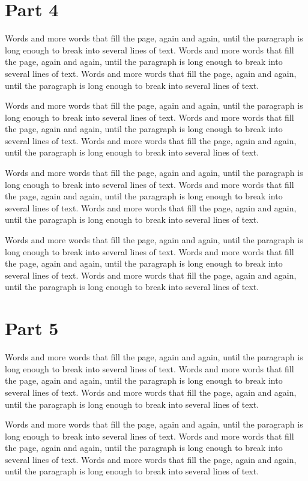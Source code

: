 \documentclass{article}
\begin{document}
\section{Part 4}
Words and more words that fill the page, again and again, until the paragraph is long enough to break into several lines of text. Words and more words that fill the page, again and again, until the paragraph is long enough to break into several lines of text. Words and more words that fill the page, again and again, until the paragraph is long enough to break into several lines of text. 

Words and more words that fill the page, again and again, until the paragraph is long enough to break into several lines of text. Words and more words that fill the page, again and again, until the paragraph is long enough to break into several lines of text. Words and more words that fill the page, again and again, until the paragraph is long enough to break into several lines of text. 

Words and more words that fill the page, again and again, until the paragraph is long enough to break into several lines of text. Words and more words that fill the page, again and again, until the paragraph is long enough to break into several lines of text. Words and more words that fill the page, again and again, until the paragraph is long enough to break into several lines of text. 

Words and more words that fill the page, again and again, until the paragraph is long enough to break into several lines of text. Words and more words that fill the page, again and again, until the paragraph is long enough to break into several lines of text. Words and more words that fill the page, again and again, until the paragraph is long enough to break into several lines of text. 

\section{Part 5}
Words and more words that fill the page, again and again, until the paragraph is long enough to break into several lines of text. Words and more words that fill the page, again and again, until the paragraph is long enough to break into several lines of text. Words and more words that fill the page, again and again, until the paragraph is long enough to break into several lines of text. 

Words and more words that fill the page, again and again, until the paragraph is long enough to break into several lines of text. Words and more words that fill the page, again and again, until the paragraph is long enough to break into several lines of text. Words and more words that fill the page, again and again, until the paragraph is long enough to break into several lines of text. 
\end{document}
